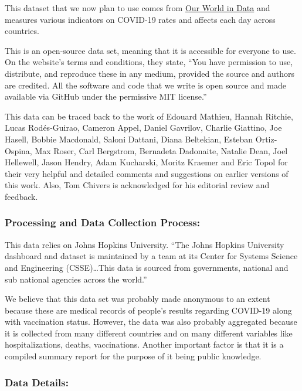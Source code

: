 \documentclass[
]{article}
\begin{document}
This dataset that we now plan to use comes from
\href{https://ourworldindata.org/covid-cases}{Our World in Data} and
measures various indicators on COVID-19 rates and affects each day
across countries.

This is an open-source data set, meaning that it is accessible for
everyone to use. On the website's terms and conditions, they state,
``You have permission to use, distribute, and reproduce these in any
medium, provided the source and authors are credited. All the software
and code that we write is open source and made available via GitHub
under the permissive MIT license.''

This data can be traced back to the work of Edouard Mathieu, Hannah
Ritchie, Lucas Rodés-Guirao, Cameron Appel, Daniel Gavrilov, Charlie
Giattino, Joe Hasell, Bobbie Macdonald, Saloni Dattani, Diana Beltekian,
Esteban Ortiz-Ospina, Max Roser, Carl Bergstrom, Bernadeta Dadonaite,
Natalie Dean, Joel Hellewell, Jason Hendry, Adam Kucharski, Moritz
Kraemer and Eric Topol for their very helpful and detailed comments and
suggestions on earlier versions of this work. Also, Tom Chivers is
acknowledged for his editorial review and feedback.

\hypertarget{processing-and-data-collection-process}{%
\subsubsection{Processing and Data Collection
Process:}\label{processing-and-data-collection-process}}

This data relies on Johns Hopkins University. ``The Johns Hopkins
University dashboard and dataset is maintained by a team at its Center
for Systems Science and Engineering (CSSE)\ldots This data is sourced
from governments, national and sub national agencies across the world.''

We believe that this data set was probably made anonymous to an extent
because these are medical records of people's results regarding COVID-19
along with vaccination status. However, the data was also probably
aggregated because it is collected from many different countries and on
many different variables like hospitalizations, deaths, vaccinations.
Another important factor is that it is a compiled summary report for the
purpose of it being public knowledge.

\hypertarget{data-details}{%
\subsubsection{Data Details:}\label{data-details}}
\end{document}
